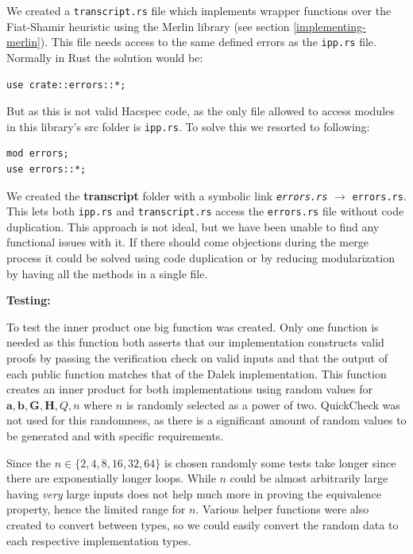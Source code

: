 \documentclass{article}
\renewcommand{\vec}[1]{\boldsymbol{#1}}
\begin{document}
We created a \texttt{transcript.rs} file which implements wrapper
functions over the Fiat-Shamir heuristic using the Merlin
library (see section \ref{implementing-merlin}). This file needs 
access to the same defined errors as the \texttt{ipp.rs} file. 
Normally in Rust the solution would be: 

\begin{lstlisting}
use crate::errors::*;
\end{lstlisting}

But as this is not valid Hacspec code, as the only file allowed to 
access modules in this library's src folder is \texttt{ipp.rs}. To
solve this we resorted to following:

\begin{lstlisting}
mod errors;
use errors::*;
\end{lstlisting}

We created the \textbf{transcript} folder with a symbolic link
\texttt{\textit{errors.rs}} $\rightarrow$ \texttt{errors.rs}. This
lets both \texttt{ipp.rs} and \texttt{transcript.rs} access the
\texttt{errors.rs} file without code duplication. This approach is not
ideal, but we have been unable to find any functional issues with it. If
there should come objections during the merge process it could be solved
using code duplication or by reducing modularization by having all the 
methods in a single file.

\textbf{Testing:}

To test the inner product one big function was created. Only one
function is needed as this function both asserts that our implementation
constructs valid proofs by passing the verification check on valid
inputs and that the output of each public function matches that of the
Dalek implementation. This function creates an inner product for
both implementations using random values for $\vec{a}, \vec{b}, \vec{G},
\vec{H}, Q, n$ where $n$ is randomly selected as a power of two. 
QuickCheck was not used for this randomness, as there is a significant 
amount of random values to be generated and with specific requirements.

Since the $n \in \{2, 4, 8, 16, 32, 64\}$ is chosen randomly some tests
take longer since there are exponentially longer loops. While $n$
could be almost arbitrarily large having \textit{very} large inputs does
not help much more in proving the equivalence property, hence the 
limited range for $n$. Various helper functions were also created to 
convert between types, so we could easily convert the random data to 
each respective implementation types.
\end{document}
